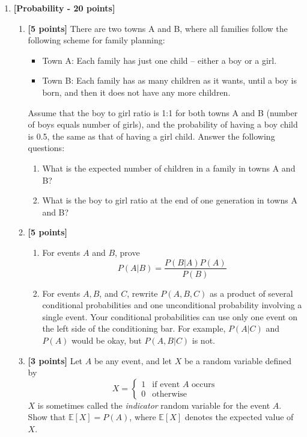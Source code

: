 \begin{enumerate}
\item {\bf [Probability - 20 points]}
\begin{enumerate}

\item {\bf [5 points]} There are two towns A and B, where all families follow the following scheme for family planning:
\begin{itemize}
\item Town A: Each family has just one child -- either a boy or a girl.
\item Town B: Each family has as many children as it wants, until a boy is born, and then it does not have any more children.
\end{itemize}
Assume that the boy to girl ratio is 1:1 for both towns A and B (number of boys equals number of girls), and the probability of having a boy child is 0.5, the same as that of having a girl child. Answer the following questions:
\begin{enumerate}
\item What is the expected number of children in a family in towns A and B?
\item What is the boy to girl ratio at the end of one generation in towns A and B?
\end{enumerate}

\item {\bf [5 points]} 
\begin{enumerate}
	\item For events $A$ and $B$, prove
	$$
	P(A|B) = \frac{P(B|A) P(A) }{P(B)}
	$$ 
	\item For events $A, B$, and $C$, rewrite $P(A, B, C)$ as a product of several conditional probabilities and one unconditional probability involving a single event. Your conditional probabilities can use only one event on the left side of the conditioning bar. For example, $P(A|C)$ and $P(A)$ would be okay, but $P(A, B |C)$ is not.
	\end{enumerate}
	
	\item{\bf [3 points]}  Let $A$ be any event, and let $X$ be a random variable defined by 
	$$
	X = 
	\begin{cases}
	1 & \text{if event $A$ occurs} \\ 
	0 & \text{otherwise}
	\end{cases}
	$$
	$X$ is sometimes called the \textit{indicator} random variable for the event $A$. Show that $\mathbb{E}[X] = P(A)$, where $\mathbb{E}[X]$ denotes the expected value of $X$.
	

\end{enumerate}
\end{enumerate}
